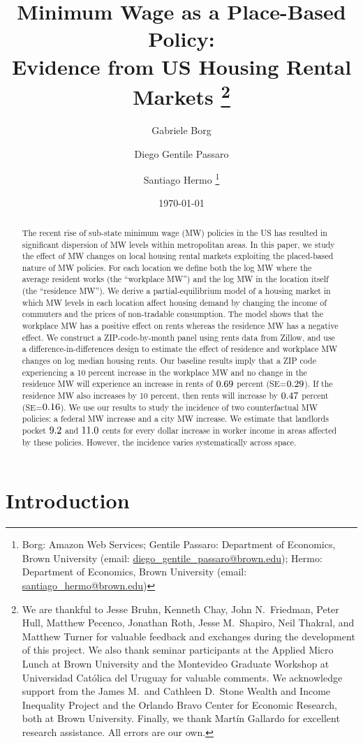 \documentclass{article}
\title{ Minimum Wage as a Place-Based Policy: \\
        Evidence from US Housing Rental Markets%
        \thanks{We are thankful to Jesse Bruhn, Kenneth Chay, John N.\ Friedman, 
        Peter Hull, Matthew Pecenco, Jonathan Roth, Jesse M.\ Shapiro, 
        Neil Thakral, and Matthew Turner
        for valuable feedback and exchanges during the development of 
        this project.
        We also thank seminar participants at the Applied Micro Lunch at Brown
        University and the Montevideo Graduate Workshop at Universidad Católica 
        del Uruguay for valuable comments.
        We acknowledge support from 
        the James M.\ and Cathleen D.\ Stone 
        Wealth and Income Inequality Project and 
        the Orlando Bravo Center for Economic Research, both at Brown University.
        Finally, we thank Martín Gallardo for excellent research assistance.
        All errors are our own.}}
\author{Gabriele Borg \and Diego Gentile Passaro \and Santiago Hermo%
        \footnote{Borg: Amazon Web Services;
        Gentile Passaro: Department of Economics, Brown University 
        (email: \url{diego_gentile_passaro@brown.edu}); 
        Hermo: Department of Economics, Brown University 
        (email: \url{santiago_hermo@brown.edu})}}
\date{\today}
\begin{document}
\maketitle

\begin{abstract}
    \noindent
    The recent rise of sub-state minimum wage (MW) policies in the US has 
    resulted in significant dispersion of MW levels within metropolitan areas.
    In this paper, we study the effect of MW changes on local housing rental 
    markets exploiting the placed-based nature of MW policies.
    For each location we define both
    the log MW where the average resident works (the ``workplace MW'')
    and the log MW in the location itself (the ``residence MW'').
    We derive a partial-equilibrium model of a housing market
    in which MW levels in each location affect housing demand by 
    changing the income of commuters and the prices of non-tradable consumption.
    The model shows that the workplace MW has a positive effect on rents 
    whereas the residence MW has a negative effect.
    We construct a ZIP-code-by-month panel using rents data from Zillow, and
    use a difference-in-differences design to estimate the effect of 
    residence and workplace MW changes on log median housing rents.
    Our baseline results imply that a ZIP code experiencing a 
    10 percent increase in the workplace MW and 
    no change in the residence MW will experience an increase in rents 
    of $\textnormal{0.69}$ percent (SE=$\textnormal{0.29}$).
    If the residence MW also increases by 10 percent, then 
    rents will increase by $\textnormal{0.47}$ percent (SE=$\textnormal{0.16}$).
    We use our results to study the incidence of two counterfactual MW policies:
    a federal MW increase and a city MW increase.
    We estimate that landlords pocket $\textnormal{9.2}$ and 
    $\textnormal{11.0}$ cents for every dollar increase in worker
    income in areas affected by these policies.
    However, the incidence varies systematically across space.
\end{abstract}

\vspace{5mm}


\clearpage

\section{Introduction}\label{sec:intro}
    
\end{document}

